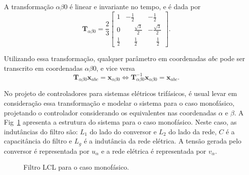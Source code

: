   A transformação $\alpha \beta 0$ é linear e invariante no tempo, e é dada por
  \begin{equation}
    \mathbf{T}_{\alpha \beta 0} = \frac{2}{3} \left[
    \begin{array}{ccc}
      1 & -\frac{1}{2} & -\frac{1}{2} \\[0.3em]
      0 & \phantom{-}\frac{\sqrt{3}}{2} & -\frac{\sqrt{3}}{2} \\[0.3em]
      \frac{1}{2} &  \phantom{-}\frac{1}{2} & \phantom{-}\frac{1}{2}
    \end{array}
    \right] \text{.}
    \label{eq:alpha_beta_0}
  \end{equation}

  Utilizando essa transformação, qualquer parâmetro em coordenadas $abc$ pode ser transcrito em coordenadas $\alpha \beta 0$, e vice versa
  \begin{equation}
    \mathbf{T}_{\alpha \beta 0} \mathbf{x}_{abc} = \mathbf{x}_{\alpha \beta 0}
    \iff
    \mathbf{T}_{\alpha \beta 0}^{-1} \mathbf{x}_{\alpha \beta 0} = \mathbf{x}_{abc}
    \text{.}
  \end{equation}

  No projeto de controladores para sistemas elétricos trifásicos, é usual levar em consideração essa transformação e modelar o sistema para o caso monofásico, projetando o controlador considerando os equivalentes nas coordenadas $\alpha$ e $\beta$. A Fig~\ref{fig:LCL_geral} apresenta a estrutura do sistema para o caso monofásico. Neste caso, as indutâncias do filtro são: $L_1$ do lado do conversor e $L_2$ do lado da rede, $C$ é a capacitância do filtro e $L_g$ é a indutância da rede elétrica. A tensão gerada pelo conversor é representada por $u_{\alpha}$ e a rede elétrica é representada por
  $v_{\alpha}$.

  \begin{figure}[htb]
    \centering{
      \def\svgwidth{\textwidth}
      }
    \renewcommand\figurename{Fig.}
    \caption{Filtro LCL para o caso monofásico.}
    \label{fig:LCL_geral}
  \end{figure}

